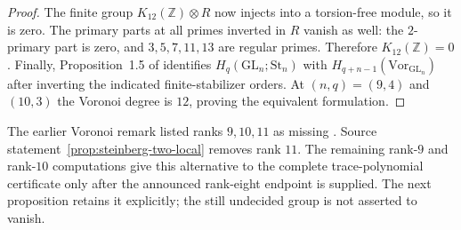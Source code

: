 \begin{proof}
The finite group $K_{12}(\mathbb Z)\otimes R$ now injects into a
torsion-free module, so it is zero. The primary parts at all primes
inverted in $R$ vanish as well: the $2$-primary part is zero, and
$3,5,7,11,13$ are regular primes. Therefore $K_{12}(\mathbb Z)=0$.
Finally, Proposition~1.5 of \cite{DEKM2026} identifies
$H_q(\mathrm{GL}_n;\mathrm{St}_n)$ with
$H_{q+n-1}(\mathrm{Vor}_{\mathrm{GL}_n})$ after inverting the
indicated finite-stabilizer orders. At $(n,q)=(9,4)$ and $(10,3)$
the Voronoi degree is $12$, proving the equivalent formulation.
\end{proof}

The earlier Voronoi remark listed ranks $9,10,11$ as missing
\cite[Remark~6.6, author-preprint p.~19]{DEKM2026}.
Source statement~\ref{prop:steinberg-two-local} removes rank $11$.
The remaining rank-$9$ and rank-$10$ computations give this alternative
to the complete trace-polynomial certificate only after the announced
rank-eight endpoint is supplied. The next proposition retains it
explicitly; the still undecided group is not asserted to vanish.
